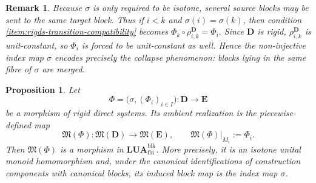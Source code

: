 \documentclass[pdflatex,sn-mathphys-num]{sn-jnl}
\theoremstyle{thmstyleone}%
\newtheorem{proposition}[theorem]{Proposition}
\theoremstyle{thmstyletwo}%
\newtheorem{remark}[theorem]{Remark}
\theoremstyle{thmstylethree}%
\begin{document}
\begin{remark}\label{rem:collapse-via-sigma}
Because \(\sigma\) is only required to be isotone, several source blocks may be sent to the same target block.
Thus if \(i<k\) and \(\sigma(i)=\sigma(k)\), then condition \ref{item:rigds-transition-compatibility} becomes \(\Phi_k\circ \rho^{\mathbf D}_{i,k}=\Phi_i. \)
Since \(\mathbf D\) is rigid, \(\rho^{\mathbf D}_{i,k}\) is unit-constant, so \(\Phi_i\) is forced to be unit-constant as well.
Hence the non-injective index map \(\sigma\) encodes precisely the collapse phenomenon: blocks lying in the same fibre of \(\sigma\) are merged.
\end{remark}

\begin{proposition}\label{prop:realization-of-rigds-morphism}
Let
\[
\Phi=\bigl(\sigma,(\Phi_i)_{i\in I}\bigr)\colon \mathbf D\to \mathbf E
\]
be a morphism of rigid direct systems.
Its \emph{ambient realization} is the piecewise-defined map
\[
\mathfrak M(\Phi)\colon \mathfrak M(\mathbf D)\to \mathfrak M(\mathbf E),
\qquad
\mathfrak M(\Phi)|_{M_i}:=\Phi_i.
\]
Then \(\mathfrak M(\Phi)\) is a morphism in \(\mathbf{LUA}^{\mathrm{blk}}_{\mathrm{fin}}\).
More precisely, it is an isotone unital monoid homomorphism and, under the canonical identifications of construction components with canonical blocks, its induced block map is the index map \(\sigma\).
\end{proposition}
\end{document}
